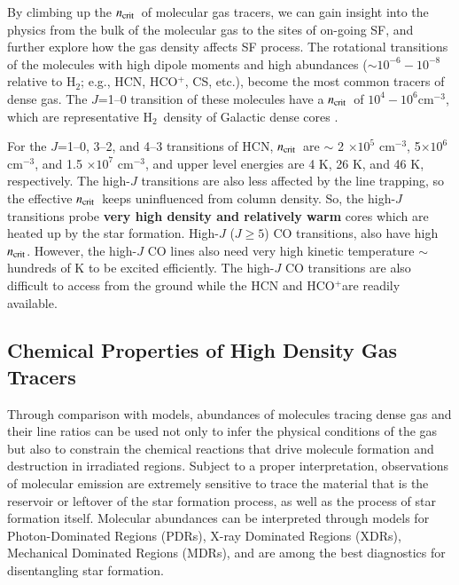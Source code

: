 \documentclass[legal,11pt]{article}
\def\cmt   {cm$^{-3}$\,}
\def\,{\thinspace}
\def\Htwo{H$_2$}
\def\ncrit{$n_{\rm crit}$}
\def\HCOP       {HCO$^{+}$}
\def\Htwo       {H$_2$}
\begin{document}

By climbing up the \ncrit\ of molecular gas tracers, we can gain insight into the
physics from the bulk of the molecular gas to the sites of on-going SF, and
further explore how the gas density affects SF process.  The rotational
transitions of the molecules with high dipole moments and high abundances
($\sim 10^{-6}-10^{-8}$ relative to \Htwo; e.g., HCN, \HCOP, CS, etc.), become
the most common tracers of dense gas. The $J$=1--0 transition of these
molecules have a \ncrit\  of $10^4 - 10^6$\cmt, which are representative \Htwo\
density of Galactic dense cores \citep[e.g.,][]{Plume1997,weg05}. 



For the $J$=1--0, 3--2, and 4--3 transitions of HCN,  \ncrit\ are $\sim$ 2
$\times 10^5$ \cmt, 5$\times 10^6$ \cmt, and 1.5 $\times 10^7$ \cmt, and upper
level energies are 4 K, 26 K, and 46 K, respectively. The high-$J$ transitions
are also less affected by the line trapping, so the effective \ncrit\ keeps
uninfluenced from column density. So, the high-$J$ transitions probe {\bf very
high density and relatively warm} cores which are heated up by the star
formation. High-$J$ ($J\ge 5$) CO transitions, also have high \ncrit. However,
the high-$J$ CO lines also need very high kinetic temperature $\sim$hundreds of
K to be excited efficiently. The high-$J$ CO transitions are also difficult to
access from the ground while the HCN and \HCOP are readily available. 




\subsection{Chemical Properties of High Density Gas Tracers  }

Through comparison with models, abundances of molecules tracing dense gas and
their line ratios can be used not only to infer the physical conditions of the
gas but also to constrain the chemical reactions that drive molecule formation
and destruction in irradiated regions\citep[e.g.,][]{vandishoeck1998}. Subject
to a proper interpretation, observations of molecular emission are extremely
sensitive to trace the material that is the reservoir or leftover of the star
formation process, as well as the process of star formation itself. Molecular
abundances can be interpreted through models for Photon-Dominated Regions
(PDRs), X-ray Dominated Regions (XDRs), Mechanical Dominated Regions (MDRs),
and are among the best diagnostics for disentangling star formation.
\end{document}
